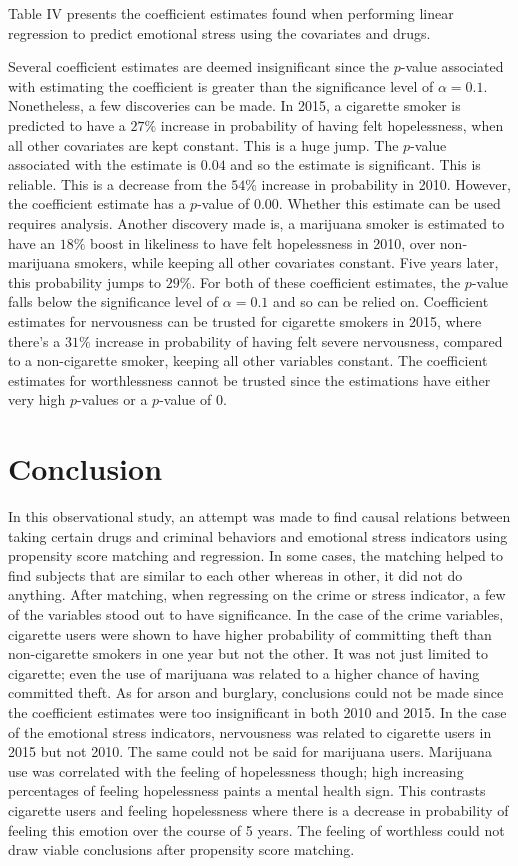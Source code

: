 \documentclass[a4paper, 10pt, conference]{ieeeconf}      %
\begin{document}
\parindent 10pt Table IV presents the coefficient estimates found when performing linear regression to predict emotional stress using the covariates and drugs. 
 
Several coefficient estimates are deemed insignificant since the $p$-value associated with estimating the coefficient is greater than the significance level of $\alpha = 0.1$. Nonetheless, a few discoveries can be made. In 2015, a cigarette smoker is predicted to have a $27\%$ increase in probability of having felt hopelessness, when all other covariates are kept constant. This is a huge jump. The $p$-value associated with the estimate is $0.04$ and so the estimate is significant. This is reliable. This is a decrease from the $54\%$ increase in probability in 2010. However, the coefficient estimate has a $p$-value of $0.00$. Whether this estimate can be used requires analysis. Another discovery made is, a marijuana smoker is estimated to have an $18\%$ boost in likeliness to have felt hopelessness in 2010, over non-marijuana smokers, while keeping all other covariates constant. Five years later, this probability jumps to $29\%$. For both of these coefficient estimates, the $p$-value falls below the significance level of $\alpha = 0.1$ and so can be relied on. Coefficient estimates for nervousness can be trusted for cigarette smokers in 2015, where there's a $31\%$ increase in probability of having felt severe nervousness, compared to a non-cigarette smoker, keeping all other variables constant. The coefficient estimates for worthlessness cannot be trusted since the estimations have either very high $p$-values or a $p$-value of $0$.


\section{Conclusion}

In this observational study, an attempt was made to find causal relations between taking certain drugs and criminal behaviors and emotional stress indicators using propensity score matching and regression. In some cases, the matching helped to find subjects that are similar to each other whereas in other, it did not do anything. After matching, when regressing on the crime or stress indicator, a few of the variables stood out to have significance. In the case of the crime variables, cigarette users were shown to have higher probability of committing theft than non-cigarette smokers in one year but not the other. It was not just limited to cigarette; even the use of marijuana was related to a higher chance of having committed theft. As for arson and burglary, conclusions could not be made since the coefficient estimates were too insignificant in both 2010 and 2015. In the case of the emotional stress indicators, nervousness was related to cigarette users in 2015 but not 2010. The same could not be said for marijuana users. Marijuana use was correlated with the feeling of hopelessness though; high increasing percentages of feeling hopelessness paints a mental health sign. This contrasts cigarette users and feeling hopelessness where there is a decrease in probability of feeling this emotion over the course of 5 years. The feeling of worthless could not draw viable conclusions after propensity score matching. 
\end{document}
